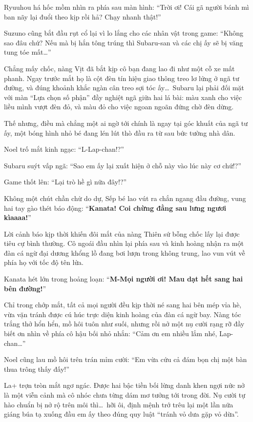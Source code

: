 \documentclass[../main.tex]{subfiles}
\begin{document}
Ryuuhou há hốc mồm nhìn ra phía sau màn hình: ``Trời ơi! Cái gã người bánh mì ban nãy lại đuổi theo kịp rồi hả? Chạy nhanh thật!''

Suzuno cũng bắt đầu rụt cổ lại vì lo lắng cho các nhân vật trong game: ``Không sao đâu chứ? Nếu mà bị hắn tông trúng thì Subaru-san và các chị ấy sẽ bị văng tung tóe mất\dots''

Chẳng mấy chốc, nàng Vịt đã bắt kịp cô bạn đang lao đi như một cỗ xe mất phanh. Ngay trước mắt họ là cột đèn tín hiệu giao thông treo lơ lửng ở ngã tư đường, và đúng khoảnh khắc ngàn cân treo sợi tóc ấy\dots\ Subaru lại phải đối mặt với màn ``Lựa chọn số phận'' đầy nghiệt ngã giữa hai lá bài: màu xanh cho việc liều mình vượt đèn đỏ, và màu đỏ cho việc ngoan ngoãn đứng chờ đèn dừng.

Thế nhưng, điều mà chẳng một ai ngờ tới chính là ngay tại góc khuất của ngã tư ấy, một bóng hình nhỏ bé đang lén lút thò đầu ra từ sau bức tường nhà dân.

Noel trố mắt kinh ngạc: ``L-Lap-chan!?''

Subaru suýt vấp ngã: ``Sao em ấy lại xuất hiện ở chỗ này vào lúc này cơ chứ!?''

Game thốt lên: ``Lại trò hề gì nữa đây!?''

Không một chút chần chừ do dự, Sếp bé lao vút ra chắn ngang đầu đường, vung hai tay gào thét báo động: ``\textbf{Kanata! Coi chừng đằng sau lưng ngươi kìaaaa!}''

Lời cảnh báo kịp thời khiến đôi mắt của nàng Thiên sứ bỗng chốc lấy lại được tiêu cự bình thường. Cô ngoái đầu nhìn lại phía sau và kinh hoàng nhận ra một đàn cá ngừ đại dương khổng lồ đang bơi lượn trong không trung, lao vun vút về phía họ với tốc độ tên lửa.

Kanata hét lớn trong hoảng loạn: ``\textbf{M-Mọi người ơi! Mau dạt hết sang hai bên đường!}''

Chỉ trong chớp mắt, tất cả mọi người đều kịp thời né sang hai bên mép vỉa hè, vừa vặn tránh được cú húc trực diện kinh hoàng của đàn cá ngừ bay. Nàng tóc trắng thở hổn hển, mồ hôi tuôn như suối, nhưng rồi nở một nụ cười rạng rỡ đầy biết ơn nhìn về phía cô hậu bối nhỏ nhắn: ``Cảm ơn em nhiều lắm nhé, Lap-chan\dots''

Noel cũng lau mồ hôi trên trán mỉm cười: ``Em vừa cứu cả đám bọn chị một bàn thua trông thấy đấy!''

La+ trợn tròn mắt ngơ ngác. Được hai bậc tiền bối lừng danh khen ngợi nức nở là một viễn cảnh mà cô nhóc chưa từng dám mơ tưởng tới trong đời. Nụ cười tự hào chuẩn bị nở rộ trên môi thì\dots\ hỡi ôi, định mệnh trớ trêu lại một lần nữa giáng búa tạ xuống đầu em ấy theo đúng quy luật ``tránh vỏ dưa gặp vỏ dừa''.
\end{document}
